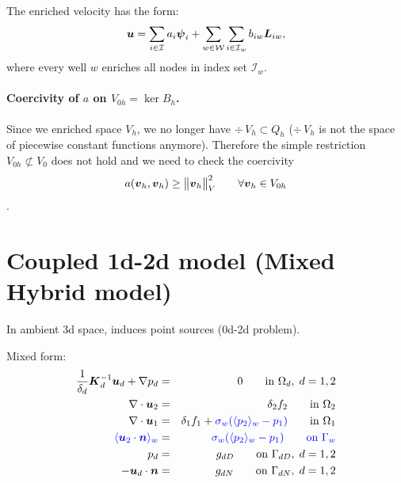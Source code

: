 The enriched velocity has the form:
\[
    \mathbf{\boldsymbol{u}} = 
    \sum \limits_{i\in\mathcal{I}} a_i \mathbf{\boldsymbol{\psi}}_i + 
    \sum \limits_{w\in\mathcal{W}} \sum \limits_{i\in\mathcal{I}_w} b_{iw} \mathbf{\boldsymbol{L}}_{iw},
\]
where every well $w$ enriches all nodes in index set $\mathcal{I}_w$.

\paragraph{Coercivity of $a$ on $V_{0h}=\ker B_h$.}
Since we enriched space $V_h$, we no longer have $\div\,V_{h}\subset Q_h$
($\div\,V_{h}$ is not the space of piecewise constant functions anymore).
Therefore the simple restriction $V_{0h}\not\subset V_0$ does not hold and 
we need to check the coercivity
\[a(\mathbf{\boldsymbol{v}}_h,\mathbf{\boldsymbol{v}}_h)\geq \bigl\Vert\mathbf{\boldsymbol{v}}_h\bigr\Vert^2_V  \qquad \forall \mathbf{\boldsymbol{v}}_h\in V_{0h}\].


\section{Coupled 1d-2d model (Mixed Hybrid model)}

In ambient 3d space, induces point sources (0d-2d problem).
  
  Mixed form:
  \begin{eqnarray}
\frac{1}{\delta_d} \mathbf{\boldsymbol{K}}_d^{-1}\mathbf{\boldsymbol{u}}_d + \nabla p_d &=& 0 \qquad \textrm{in } \Omega_d,\; d=1,2  \\
\nabla \cdot \mathbf{\boldsymbol{u}}_2 &=& \delta_2 f_2 \qquad \textrm{in } \Omega_2\\
\nabla \cdot \mathbf{\boldsymbol{u}}_1 &=& \delta_1 f_1 + {\color{blue}\sigma_w(\langle p_2\rangle_w-p_1)}\qquad \textrm{in } \Omega_1\\
\color{blue}\langle\mathbf{\boldsymbol{u}}_2 \cdot \mathbf{\boldsymbol{n}}\rangle_w &=& \color{blue}\sigma_w (\langle p_2\rangle_w - p_{1}) \qquad \textrm{on } \Gamma_w\\
p_d &=& g_{dD} \qquad \textrm{on } \Gamma_{dD},\; d=1,2 \\
-\mathbf{\boldsymbol{u}}_d \cdot \mathbf{\boldsymbol{n}} &=& g_{dN} \qquad \textrm{on } \Gamma_{dN},\; d=1,2
  \end{eqnarray}
  
